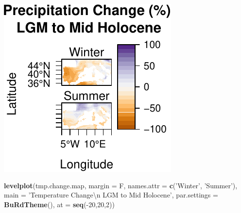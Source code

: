 \documentclass[11pt,]{tufte-handout}
\newenvironment{Shaded}{}{}
\newcommand{\KeywordTok}[1]{\textcolor[rgb]{0.00,0.44,0.13}{\textbf{{#1}}}}
\newcommand{\DataTypeTok}[1]{\textcolor[rgb]{0.56,0.13,0.00}{{#1}}}
\newcommand{\DecValTok}[1]{\textcolor[rgb]{0.25,0.63,0.44}{{#1}}}
\newcommand{\CharTok}[1]{\textcolor[rgb]{0.25,0.44,0.63}{{#1}}}
\newcommand{\StringTok}[1]{\textcolor[rgb]{0.25,0.44,0.63}{{#1}}}
\newcommand{\NormalTok}[1]{{#1}}
\begin{document}
\begin{Shaded}
\end{Shaded}

\includegraphics{proxymodelcomparison_files/figure-latex/unnamed-chunk-6-1}

\begin{Shaded}
\begin{Highlighting}[]
\KeywordTok{levelplot}\NormalTok{(tmp.change.map, }\DataTypeTok{margin =} \NormalTok{F, }\DataTypeTok{names.attr =} \KeywordTok{c}\NormalTok{(}\StringTok{'Winter'}\NormalTok{, }\StringTok{'Summer'}\NormalTok{), }
          \DataTypeTok{main =} \StringTok{'Temperature Change}\CharTok{\textbackslash{}n}\StringTok{ LGM to Mid Holocene'}\NormalTok{,}
          \DataTypeTok{par.settings =} \KeywordTok{BuRdTheme}\NormalTok{(),}
          \DataTypeTok{at =} \KeywordTok{seq}\NormalTok{(-}\DecValTok{20}\NormalTok{,}\DecValTok{20}\NormalTok{,}\DecValTok{2}\NormalTok{))}
\end{Highlighting}
\end{Shaded}
\end{document}
